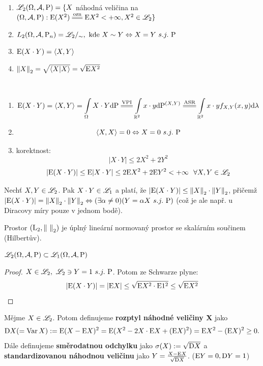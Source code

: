 \begin{define}~
	\begin{enumerate}
	\item $\mathscr{L}_2(\Omega,\mathcal{A},\mathrm{P})=\{ X$ náhodná veličina na $\prostor:\E (X^2)\equal{\text{ozn}}\E X^2<+\infty,X^2\in\LL_2 \}$
	\item $	\\L_2(\Omega,\mathcal{A},\mathrm{P}_n)=\mathscr{L}_2/_\sim,\text{ kde }X\sim Y\Leftrightarrow X=Y~s.j.~\mathrm{P} $
	\item $ \mathrm{E} (X\cdot Y)=\langle X,Y\rangle  $
	\item $ \left\|X\right\|_2=\sqrt{\langle X|X\rangle}=\sqrt{\mathrm{E} X^2} $
	\end{enumerate}
\end{define}
\begin{remark}~
	 \begin{enumerate}
	 	\item $$ \E (X\cdot Y)=\langle X,Y\rangle=\int\limits_{\Omega}X\cdot Y\dif \PP\equal{\text{VPI}}\int\limits_{\R^2}x\cdot y\dif \PP^{(X,Y)}\equal{\text{ASR}}\int\limits_{\R^2}x\cdot yf_{X,Y}(x,y)\dif\lambda  $$
	 	\item $$ \langle X,X \rangle=0\Leftrightarrow X=0~s.j.~\mathrm{P} $$
	 	\item korektnost: $$ |X\cdot Y|\leq 2X^2+2Y^2 $$
	 	$$ |\mathrm{E} (X\cdot Y)|\leq \mathrm{E} |X\cdot Y|\leq 2\mathrm{E} X^2+2\mathrm{E} Y^2<+\infty~~\forall X,Y\in\mathscr{L}_2 $$
	 \end{enumerate}
\end{remark}
\begin{theorem}[Schwarz]
	Nechť $X,Y\in\mathscr{L}_2$. Pak $X\cdot Y\in\mathscr{L}_1$ a platí, že $|\mathrm{E} (X\cdot Y)|\leq \left\|X\right\|_2 \cdot \left\|Y\right\|_2$, přičemž $|\mathrm{E} (X\cdot Y)|= \left\|X\right\|_2 \cdot \left\|Y\right\|_2\Leftrightarrow (\exists\alpha\neq0)(Y=\alpha X~s.j.~\mathrm{P})$ (což je ale např. u Diracovy míry pouze v jednom bodě).
\end{theorem}
\begin{dusl}
	Prostor $ (\mathrm{L}_2, \left\|~\right\|_2) $ je úplný lineární normovaný prostor se skalárním součinem (Hilbertův).
\end{dusl}
\begin{theorem}
	$ \mathscr{L}_2 (\Omega,\mathcal{A},\mathrm{P})\subset\mathscr{L}_1(\Omega,\mathcal{A},\mathrm{P})$
	\begin{proof}
		$X\in\mathscr{L}_2,~\mathscr{L}_2\ni Y=1~s.j.~\mathrm{P}$. Potom ze Schwarze plyne:
		$$ |\mathrm{E} (X\cdot Y)|=|\mathrm{E} X|\leq \sqrt{\mathrm{E} X^2\cdot \mathrm{E} 1^2}\leq \sqrt{\mathrm{E} X^2} $$
	\end{proof}
\end{theorem}
\begin{define}
	Mějme $ X\in\mathscr{L}_2 $. Potom definujeme \textbf{rozptyl náhodné veličiny X} jako $$\mathrm{D} X(=\mathop{\mathrm{Var}} X):=\mathrm{E} (X-\mathrm{E} X)^2=\mathrm{E} (X^2-2X\cdot \mathrm{E} X+(\mathrm{E} X)^2)=\mathrm{E} X^2-(\mathrm{E} X)^2 \geq 0.$$
	Dále definujeme \textbf{směrodatnou odchylku} jako $\sigma(X):=\sqrt{\mathrm{D} X} $ a \textbf{standardizovanou náhodnou veličinu} jako $Y=\frac{X-\mathrm{E} X}{\sqrt{\mathrm{D} X}}$. ($\mathrm{E} Y=0,\mathrm{D} Y=1$)
\end{define}
